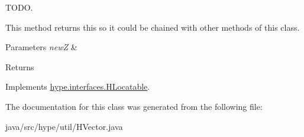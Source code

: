 T\-O\-D\-O. 

This method returns {\ttfamily this} so it could be chained with other methods of this class. 
\begin{DoxyParams}{Parameters}
{\em new\-Z} & \\
\hline
\end{DoxyParams}
\begin{DoxyReturn}{Returns}

\end{DoxyReturn}


Implements \hyperlink{interfacehype_1_1interfaces_1_1_h_locatable_aa564f23ecbac52a2fe20e4ff47ddef05}{hype.\-interfaces.\-H\-Locatable}.



The documentation for this class was generated from the following file\-:\begin{DoxyCompactItemize}
\item 
java/src/hype/util/H\-Vector.\-java\end{DoxyCompactItemize}
